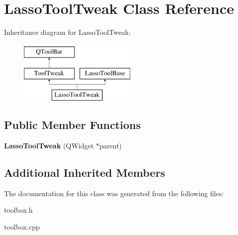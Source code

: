\hypertarget{class_lasso_tool_tweak}{\section{Lasso\-Tool\-Tweak Class Reference}
\label{class_lasso_tool_tweak}
}
Inheritance diagram for Lasso\-Tool\-Tweak\-:\begin{figure}[H]
\begin{center}
\leavevmode
\includegraphics[height=3.000000cm]{class_lasso_tool_tweak}
\end{center}
\end{figure}
\subsection*{Public Member Functions}
\begin{DoxyCompactItemize}
\item 
\hypertarget{class_lasso_tool_tweak_a33e417e8efd7a9637853ae66cc25f5a7}{{\bfseries Lasso\-Tool\-Tweak} (Q\-Widget $\ast$parent)}\label{class_lasso_tool_tweak_a33e417e8efd7a9637853ae66cc25f5a7}

\end{DoxyCompactItemize}
\subsection*{Additional Inherited Members}


The documentation for this class was generated from the following files\-:\begin{DoxyCompactItemize}
\item 
toolbox.\-h\item 
toolbox.\-cpp\end{DoxyCompactItemize}
